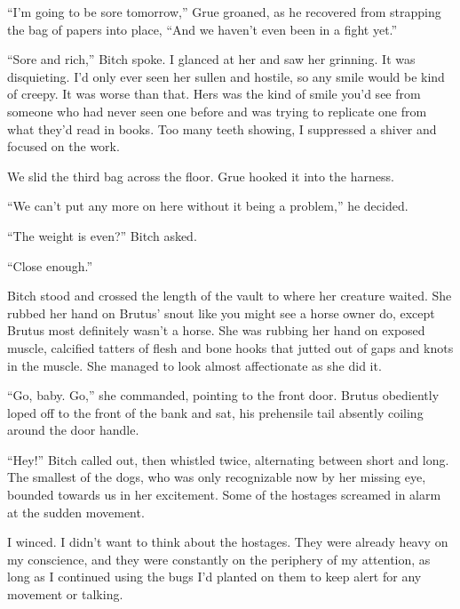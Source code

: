 ``I'm going to be sore tomorrow,'' Grue groaned, as he recovered from strapping the bag of papers into place, ``And we haven't even been in a fight yet.''



``Sore and rich,'' Bitch spoke.  I glanced at her and saw her grinning.  It was disquieting.  I'd only ever seen her sullen and hostile, so any smile would be kind of creepy.  It was worse than that.  Hers was the kind of smile you'd see from someone who had never seen one before and was trying to replicate one from what they'd read in books.  Too many teeth showing, I suppressed a shiver and focused on the work.



We slid the third bag across the floor.  Grue hooked it into the harness.



``We can't put any more on here without it being a problem,'' he decided.



``The weight is even?'' Bitch asked.



``Close enough.''



Bitch stood and crossed the length of the vault to where her creature waited. She rubbed her hand on Brutus' snout like you might see a horse owner do, except Brutus most definitely wasn't a horse. She was rubbing her hand on exposed muscle, calcified tatters of flesh and bone hooks that jutted out of gaps and knots in the muscle. She managed to look almost affectionate as she did it.



``Go, baby. Go,'' she commanded, pointing to the front door. Brutus obediently loped off to the front of the bank and sat, his prehensile tail absently coiling around the door handle.



``Hey!'' Bitch called out, then whistled twice, alternating between short and long. The smallest of the dogs, who was only recognizable now by her missing eye, bounded towards us in her excitement. Some of the hostages screamed in alarm at the sudden movement.



I winced.  I didn't want to think about the hostages. They were already heavy on my conscience, and they were constantly on the periphery of my attention, as long as I continued using the bugs I'd planted on them to keep alert for any movement or talking.



